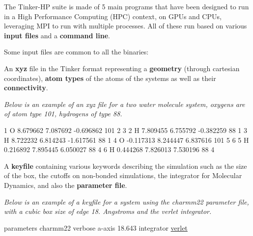 The Tinker-\/\-H\-P suite is made of 5 main programs that have been designed to run in a High Performance Computing (H\-P\-C) context, on G\-P\-Us and C\-P\-Us, leveraging M\-P\-I to run with multiple processes. All of these run based on various {\bfseries input files} and a {\bfseries command line}.

Some input files are common to all the binaries\-:


\begin{DoxyItemize}
\item An {\bfseries xyz} file in the Tinker format representing a {\bfseries geometry} (through cartesian coordinates), {\bfseries atom types} of the atoms of the systems as well as their {\bfseries connectivity}.

{\itshape Below is an example of an xyz file for a two water molecule system, oxygens are of atom type 101, hydrogens of type 88.}
\end{DoxyItemize}


\begin{DoxyCode}
1  O      8.679662    7.087692   -0.696862    101     2     3
2  H      7.809455    6.755792   -0.382259     88     1
3  H      8.722232    6.814243   -1.617561     88     1
4  O     -0.117313    8.244447    6.837616    101     5     6
5  H      0.216892    7.895445    6.050027     88     4
6  H      0.444268    7.826013    7.530196     88     4
\end{DoxyCode}



\begin{DoxyItemize}
\item A {\bfseries keyfile} containing various keywords describing the simulation such as the size of the box, the cutoffs on non-\/bonded simulations, the integrator for Molecular Dynamics, and also the {\bfseries parameter file}.

{\itshape Below is an example of a keyfile for a system using the charmm22 parameter file, with a cubic box size of edge 18. Angstroms and the verlet integrator.}
\end{DoxyItemize}


\begin{DoxyCode}
parameters        charmm22
verbose
a-axis            18.643
integrator \hyperlink{verlet_8f90_adc85925ca8af0efc52d80fe31a74bfaa}{verlet}
\end{DoxyCode}



